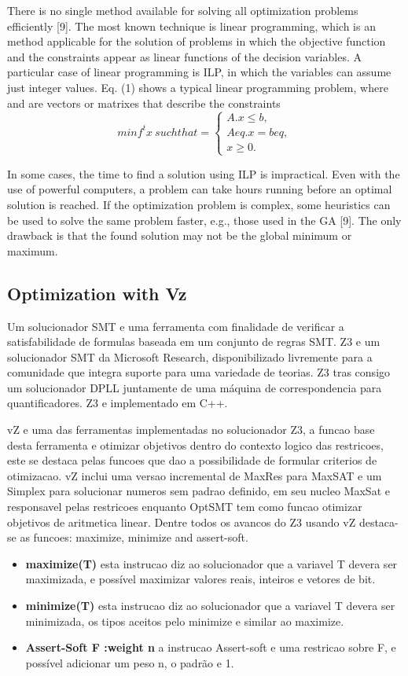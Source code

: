 There is no single method available for solving all optimization problems efficiently [9]. The most known technique is linear programming, which is an method applicable for the solution of problems in which the objective function and the constraints appear as linear functions of the decision variables. A particular case of linear programming is ILP, in which the variables can assume just integer values. Eq. (1) shows a typical linear programming problem, where  and  are vectors or matrixes that describe the constraints
\begin{equation}
  minf^t x \: such that  = 
  \begin{cases}
    A.x \leq b, \\ 
    Aeq.x = beq, \\ 
    x \geq 0.
  \end{cases}
\end{equation}

In some cases, the time to find a solution using ILP is impractical. Even with the use of powerful computers, a problem can take hours running before an optimal solution is reached. If the optimization problem is complex, some heuristics can be used to solve the same problem faster, e.g., those used in the GA [9]. The only drawback is that the found solution may not be the global minimum or maximum.

\subsection{Optimization with Vz}
Um solucionador SMT e uma ferramenta com finalidade de verificar a satisfabilidade de formulas baseada em um conjunto de regras SMT. Z3 e um solucionador SMT da Microsoft Research, disponibilizado livremente para a comunidade que integra suporte para uma variedade de teorias. Z3 tras consigo um solucionador DPLL juntamente de uma máquina de correspondencia para quantificadores. Z3 e implementado em C++.

vZ e uma das ferramentas implementadas no solucionador Z3, a funcao base desta ferramenta e otimizar objetivos dentro do contexto logico das restricoes, este se destaca pelas funcoes que dao a possibilidade de formular criterios de otimizacao. 
vZ inclui uma versao incremental de MaxRes para MaxSAT e um Simplex para solucionar numeros sem padrao definido, em seu nucleo MaxSat e responsavel pelas restricoes enquanto OptSMT tem como funcao otimizar objetivos de aritmetica linear.
Dentre todos os avancos do Z3 usando vZ destaca-se as funcoes: maximize, minimize and assert-soft.
\begin{itemize}
\item{\textbf{maximize(T)}
esta instrucao diz ao solucionador que a variavel T devera ser maximizada, e possível maximizar valores reais, inteiros e vetores de bit.}
\item{\textbf{minimize(T)}
esta instrucao diz ao solucionador que a variavel T devera ser minimizada, os tipos aceitos pelo minimize e similar ao maximize.}
\item{\textbf{Assert-Soft F :weight n}
a instrucao Assert-soft e uma restricao sobre F, e possível adicionar um peso n, o padrão e 1.} 
\end{itemize}

